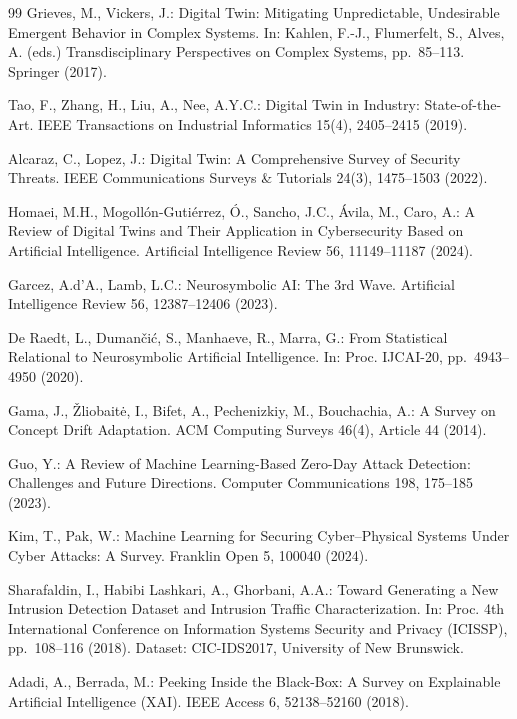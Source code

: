 \documentclass[runningheads]{llncs}
\begin{document}
\begin{thebibliography}{99}
Grieves, M., Vickers, J.:
Digital Twin: Mitigating Unpredictable, Undesirable Emergent Behavior
in Complex Systems.
In: Kahlen, F.-J., Flumerfelt, S., Alves, A. (eds.) Transdisciplinary
Perspectives on Complex Systems, pp.~85--113. Springer (2017).

Tao, F., Zhang, H., Liu, A., Nee, A.Y.C.:
Digital Twin in Industry: State-of-the-Art.
IEEE Transactions on Industrial Informatics 15(4), 2405--2415 (2019).

Alcaraz, C., Lopez, J.:
Digital Twin: A Comprehensive Survey of Security Threats.
IEEE Communications Surveys \& Tutorials 24(3), 1475--1503 (2022).

Homaei, M.H., Mogoll\'on-Guti\'errez, \'O., Sancho, J.C.,
\'Avila, M., Caro, A.:
A Review of Digital Twins and Their Application in Cybersecurity
Based on Artificial Intelligence.
Artificial Intelligence Review 56, 11149--11187 (2024).

Garcez, A.d'A., Lamb, L.C.:
Neurosymbolic AI: The 3rd Wave.
Artificial Intelligence Review 56, 12387--12406 (2023).

De Raedt, L., Dumančić, S., Manhaeve, R., Marra, G.:
From Statistical Relational to Neurosymbolic Artificial Intelligence.
In: Proc. IJCAI-20, pp.~4943--4950 (2020).

Gama, J., \v{Z}liobait\.{e}, I., Bifet, A., Pechenizkiy, M.,
Bouchachia, A.:
A Survey on Concept Drift Adaptation.
ACM Computing Surveys 46(4), Article 44 (2014).

Guo, Y.:
A Review of Machine Learning-Based Zero-Day Attack Detection:
Challenges and Future Directions.
Computer Communications 198, 175--185 (2023).

Kim, T., Pak, W.:
Machine Learning for Securing Cyber--Physical Systems Under Cyber
Attacks: A Survey.
Franklin Open 5, 100040 (2024).

Sharafaldin, I., Habibi Lashkari, A., Ghorbani, A.A.:
Toward Generating a New Intrusion Detection Dataset and Intrusion
Traffic Characterization.
In: Proc. 4th International Conference on Information Systems
Security and Privacy (ICISSP), pp.~108--116 (2018).
Dataset: CIC-IDS2017, University of New Brunswick.

Adadi, A., Berrada, M.:
Peeking Inside the Black-Box: A Survey on Explainable Artificial
Intelligence (XAI).
IEEE Access 6, 52138--52160 (2018).


\end{thebibliography}
\end{document}
